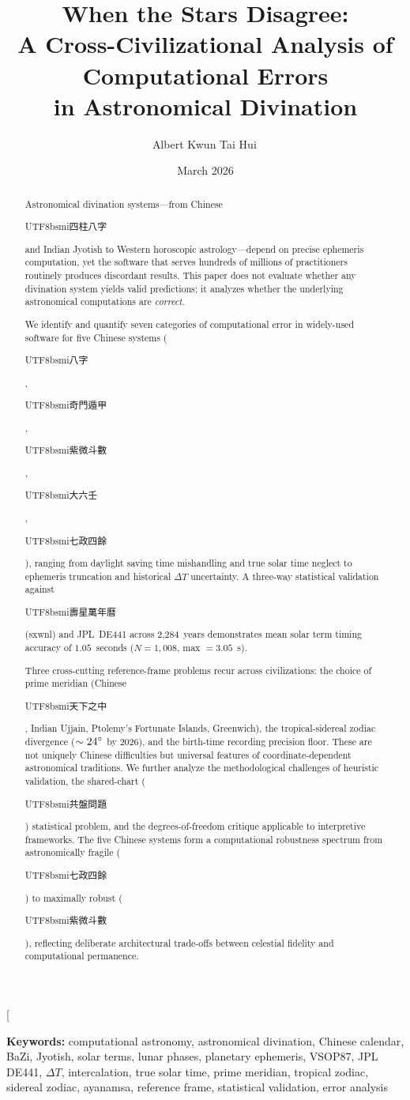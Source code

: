 \documentclass[10pt,a4paper]{article}
\title{%
  \textbf{When the Stars Disagree:}\\[4pt]
  \large A Cross-Civilizational Analysis of Computational Errors\\
  in Astronomical Divination%
}
\author[1]{Albert Kwun Tai Hui\,\orcidlink{0009-0000-8978-0231}}
\affil[1]{Security Ronin}
\date{March 2026}
\newcommand{\zh}[1]{\begin{CJK}{UTF8}{bsmi}#1\end{CJK}}
\begin{document}
\twocolumn[
\maketitle

\begin{abstract}
\noindent
Astronomical divination systems---from Chinese \zh{四柱八字}
and Indian Jyotish to Western horoscopic astrology---depend on
precise ephemeris computation, yet the software that serves hundreds
of millions of practitioners routinely produces discordant results.
This paper does not evaluate whether any divination system yields
valid predictions; it analyzes whether the underlying astronomical
computations are \emph{correct}.

We identify and quantify seven categories of computational error
in widely-used software for five Chinese systems (\zh{八字},
\zh{奇門遁甲}, \zh{紫微斗數}, \zh{大六壬}, \zh{七政四餘}), ranging
from daylight saving time mishandling and true solar time neglect
to ephemeris truncation and historical $\Delta T$ uncertainty.  A
three-way statistical validation against \zh{壽星萬年曆} (sxwnl)
and JPL~DE441 across 2,284~years demonstrates mean solar term
timing accuracy of $1.05$~seconds ($N = 1{,}008$, max $= 3.05$~s).

Three cross-cutting reference-frame problems recur across
civilizations: the choice of prime meridian (Chinese \zh{天下之中},
Indian Ujjain, Ptolemy's Fortunate Islands, Greenwich), the
tropical-sidereal zodiac divergence ($\sim 24\degree$ by 2026),
and the birth-time recording precision floor.  These are not
uniquely Chinese difficulties but universal features of
coordinate-dependent astronomical traditions.  We further analyze
the methodological challenges of heuristic validation, the
shared-chart (\zh{共盤問題}) statistical problem, and the
degrees-of-freedom critique applicable to interpretive
frameworks.  The five Chinese systems form a computational
robustness spectrum from astronomically fragile (\zh{七政四餘})
to maximally robust (\zh{紫微斗數}), reflecting deliberate
architectural trade-offs between celestial fidelity and
computational permanence.
\end{abstract}

\medskip
\noindent\textbf{Keywords:} computational astronomy, astronomical
divination, Chinese calendar, BaZi, Jyotish, solar terms, lunar
phases, planetary ephemeris, VSOP87, JPL DE441, $\Delta T$,
intercalation, true solar time, prime meridian, tropical zodiac,
sidereal zodiac, ayanamsa, reference frame, statistical validation,
error analysis
\end{document}
